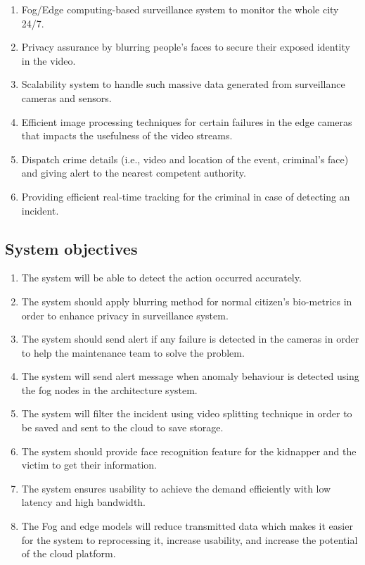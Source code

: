 \documentclass[12pt]{article}
\begin{document}
\begin{enumerate}
\item Fog/Edge computing-based surveillance system to monitor the whole city 24/7.

\item Privacy assurance by blurring people’s faces to secure their exposed identity in the video.
\item Scalability system to handle such massive data generated from surveillance cameras and sensors.
\item Efficient image processing techniques for certain failures in the edge cameras that impacts the usefulness of the video streams.
\item Dispatch crime details (i.e., video and location of the event, criminal’s face) and giving alert to the nearest competent authority.

\item Providing efficient real-time tracking for the criminal in case of detecting an incident.

\end{enumerate} 

\subsection{System objectives}
\begin{enumerate}


\item The system will be able to detect the action occurred accurately.

\item The system should apply blurring method for normal citizen’s bio-metrics in order to enhance privacy in surveillance system.
\item The system should send alert if any failure is detected in the cameras in order to help the maintenance team to solve the problem.
\item The system will send alert message when anomaly behaviour is detected using the fog nodes in the architecture system.

\item The system will filter the incident using video splitting technique in order to be saved and sent to the cloud to save storage.

\item The system should provide face recognition feature for the kidnapper and the victim to get their information.
\item The system ensures usability to achieve the demand efficiently with low latency and high bandwidth.
\item The Fog and edge models will reduce transmitted data which makes it easier for the system to reprocessing it, increase usability, and increase the potential of the cloud platform.

 \end{enumerate}
 
\end{document}
